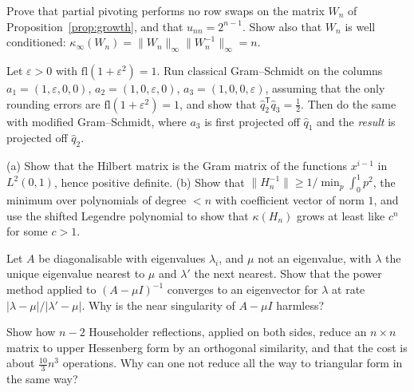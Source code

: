 \begin{exercise}[$\star$]\label{ex:wilkinsongrowth}
Prove that partial pivoting performs no row swaps on the matrix $W_n$ of Proposition~\ref{prop:growth}, and that $u_{nn}=2^{n-1}$. Show also that
$W_n$ is well conditioned: $\kappa_\infty(W_n)=\|W_n\|_\infty\|W_n^{-1}\|_\infty=n$.
\end{exercise}

\begin{exercise}[$\star\star$]\label{ex:lauchli}
Let $\varepsilon>0$ with $\mathrm{fl}(1+\varepsilon^2)=1$. Run classical Gram--Schmidt on the columns $a_1=(1,\varepsilon,0,0)$, $a_2=(1,0,\varepsilon,0)$,
$a_3=(1,0,0,\varepsilon)$, assuming that the only rounding errors are $\mathrm{fl}(1+\varepsilon^2)=1$, and show that $\hat q_2^{\mathsf T}\hat q_3=\frac12$.
Then do the same with modified Gram--Schmidt, where $a_3$ is first projected off $\hat q_1$ and the \emph{result} is projected off $\hat q_2$.
\end{exercise}

\begin{exercise}[$\star\star$]\label{ex:hilbertcond}
(a) Show that the Hilbert matrix is the Gram matrix of the functions $x^{i-1}$ in $L^2(0,1)$, hence positive definite. (b) Show that $\|H_n^{-1}\|\ge
1/\min_p\int_0^1p^2$, the minimum over polynomials of degree $<n$ with coefficient vector of norm $1$, and use the shifted Legendre polynomial to show that
$\kappa(H_n)$ grows at least like $c^n$ for some $c>1$.
\end{exercise}

\begin{exercise}[$\star$]\label{ex:inverseiteration}
Let $A$ be diagonalisable with eigenvalues $\lambda_i$, and $\mu$ not an eigenvalue, with $\lambda$ the unique eigenvalue nearest to $\mu$ and $\lambda'$ the
next nearest. Show that the power method applied to $(A-\mu I)^{-1}$ converges to an eigenvector for $\lambda$ at rate $|\lambda-\mu|/|\lambda'-\mu|$. Why is the
near singularity of $A-\mu I$ harmless?
\end{exercise}

\begin{exercise}[$\star\star$]\label{ex:hessenberg}
Show how $n-2$ Householder reflections, applied on both sides, reduce an $n\times n$ matrix to upper Hessenberg form by an orthogonal similarity, and
that the cost is about $\frac{10}3n^3$ operations. Why can one not reduce all the way to triangular form in the same way?
\end{exercise}

